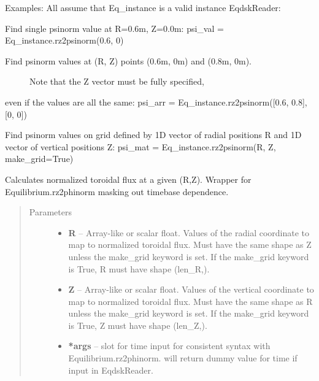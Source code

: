 \documentclass[letterpaper,10pt,english]{sphinxmanual}
\begin{document}
\begin{fulllineitems}
\begin{fulllineitems}
\begin{quote}
\begin{description}
\end{description}\end{quote}

Examples:
All assume that Eq\_instance is a valid instance EqdskReader:

Find single psinorm value at R=0.6m, Z=0.0m:
psi\_val = Eq\_instance.rz2psinorm(0.6, 0)
\begin{description}
\item[{Find psinorm values at (R, Z) points (0.6m, 0m) and (0.8m, 0m).}] \leavevmode
Note that the Z vector must be fully specified,

\end{description}

even if the values are all the same:
psi\_arr = Eq\_instance.rz2psinorm({[}0.6, 0.8{]}, {[}0, 0{]})

Find psinorm values on grid defined by 1D vector of radial positions R
and 1D vector of vertical positions Z:
psi\_mat = Eq\_instance.rz2psinorm(R, Z, make\_grid=True)

\end{fulllineitems}


\begin{fulllineitems}
\label{eqtools:eqtools.eqdskreader.EqdskReader.rz2phinorm}
Calculates normalized toroidal flux at a given (R,Z).
Wrapper for Equilibrium.rz2phinorm masking out timebase dependence.
\begin{quote}\begin{description}
\item[{Parameters }] \leavevmode\begin{itemize}
\item {} 
\textbf{R} --
Array-like or scalar float. Values of the radial coordinate to
map to normalized toroidal flux. Must have the same shape as Z
unless the make\_grid keyword is set. If the make\_grid keyword
is True, R must have shape (len\_R,).

\item {} 
\textbf{Z} --
Array-like or scalar float. Values of the vertical coordinate to
map to normalized toroidal flux. Must have the same shape as R
unless the make\_grid keyword is set. If the make\_grid keyword
is True, Z must have shape (len\_Z,).

\item {} 
\textbf{*args} --
slot for time input for consistent syntax with Equilibrium.rz2phinorm.
will return dummy value for time if input in EqdskReader.


\end{itemize}
\end{description}
\end{quote}
\end{fulllineitems}
\end{fulllineitems}
\end{document}
